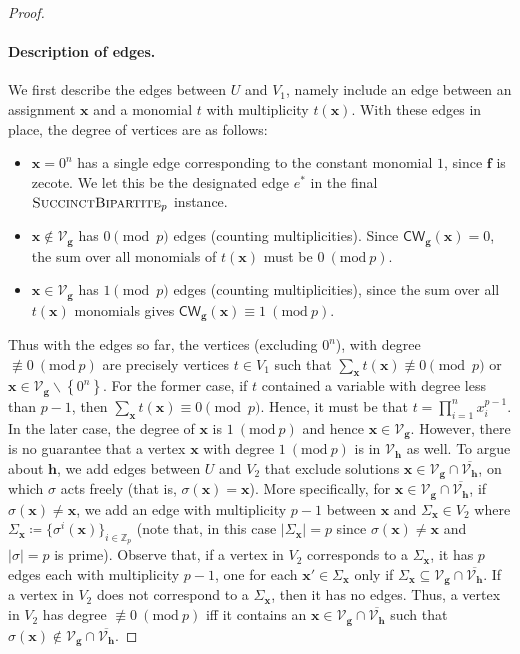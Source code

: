 \documentclass[10pt,a4paper]{article}
\theoremstyle{definition}
\theoremstyle{remark}
\let\boldm\bm
\newcommand{\inparen}[1]{\left ( #1 \right )}
\renewcommand{\mod}[1]{~\inparen{\mathrm{mod}~#1}}
\newcommand{\bx}{{\boldm x}}
\def\abs#1{\left|#1\right|}
\def\set#1{\left\{#1\right\}}
\newcommand{\bbZ}{\ensuremath{\mathbb{Z}}}
\newcommand{\calV}{\mathcal{V}}
\newcommand{\vecf}{\ensuremath{\boldsymbol{f}}}
\newcommand{\vecg}{\ensuremath{\boldsymbol{g}}}
\newcommand{\vech}{\ensuremath{\boldsymbol{h}}}
\newcommand{\vecx}{\ensuremath{\boldsymbol{x}}}
\newcommand{\sucBipartite}{\ensuremath{\textsc{SuccinctBipartite}}}
\newcommand{\CW}{\mathsf{CW}}
\begin{document}
\begin{proof}
 \paragraph{Description of edges.} We first describe the edges between $U$ and $V_1$, namely include an
 edge between an assignment $\vecx$ and a monomial $t$ with
 multiplicity $t(\vecx)$. With these edges in place, the degree of vertices are as follows:\vspace{-2mm}
 \begin{itemize}[leftmargin=0.5cm]
	\item $\vecx = 0^n$ has a single edge corresponding to the constant monomial $1$, since $\vecf$ is zecote. We let this be the designated edge $e^*$ in the final $\sucBipartite_p$ instance.
	\item $\vecx \notin \calV_{\vecg}$ has $0 \pmod p$ edges
	(counting multiplicities). Since $\CW_{\vecg}(\vecx) = 0$, the sum over all monomials of $t(\vecx)$ must be $0 \mod{p}$.
	\item $\vecx \in \calV_{\vecg}$ has $1 \pmod p$ edges (counting multiplicities), since the sum over all $t(\vecx)$ monomials gives $\CW_{\vecg}(\bx) \equiv 1 \mod{p}$.
 \end{itemize}
 Thus with the edges so far, the vertices (excluding $0^n$), with degree $\not\equiv 0 \mod{p}$ are precisely vertices  $t \in V_1$ such that $\sum_{\vecx} t(\vecx) \not\equiv 0 \pmod p$ or $\vecx \in \calV_{\vecg} \smallsetminus \set{0^n}$. For the former case, if $t$ contained a variable with degree less than $p-1$, then $\sum_{\vecx} t(\vecx) \equiv 0 \pmod p$. Hence, it must be that $t = \prod\limits_{i = 1}^{ n} x_i^{p-1}$. In the later case, the degree of $\vecx $ is $1 \mod{p}$ and hence $\vecx \in \calV_{\vecg}$. 
 However, there is no guarantee that a vertex $\vecx$ with degree $1 \mod{p}$ is in $\calV_{\vech}$ as well. To argue
 about $\vech$, we add edges between $U$ and $V_2$ that exclude solutions $\vecx \in \calV_{\vecg} \cap \overline{\calV_{\vech}}$, on which $\sigma$ acts freely (that is, $\sigma(\vecx) = \vecx$). More specifically, for
 $\vecx \in \calV_{\vecg} \cap \overline{\calV_{\vech}}$, if $\sigma(\vecx) \ne \vecx$,
  we add an edge with multiplicity $p-1$ between $\vecx$ and $\Sigma_{\vecx} \in V_2$ where $\Sigma_{\vecx} \coloneqq \{\sigma^i(\vecx)\}_{i \in \bbZ_p}$ (note that, in this case $\abs{\Sigma_{\vecx}} = p$ since $\sigma(\vecx) \ne \vecx$ and $|\sigma| = p$ is prime).
 Observe that, if a vertex in $V_2$ corresponds
 to a $\Sigma_{\vecx}$, it has $p$ edges each with multiplicity $p-1$, one for each
 $\vecx' \in \Sigma_{\vecx}$ only if $\Sigma_{\vecx} \subseteq \calV_{\vecg} \cap \overline{\calV_{\vech}}$. If a vertex in $V_2$ does not correspond to a
 $\Sigma_{\vecx}$, then it has no edges. Thus, a vertex in $V_2$ has degree $\not\equiv 0 \mod{p}$ iff it contains an $\vecx \in \calV_{\vecg} \cap \overline{\calV_{\vech}}$ such that $\sigma(\vecx) \notin \calV_{\vecg} \cap \overline{\calV_{\vech}}$.


\end{proof}
\end{document}
